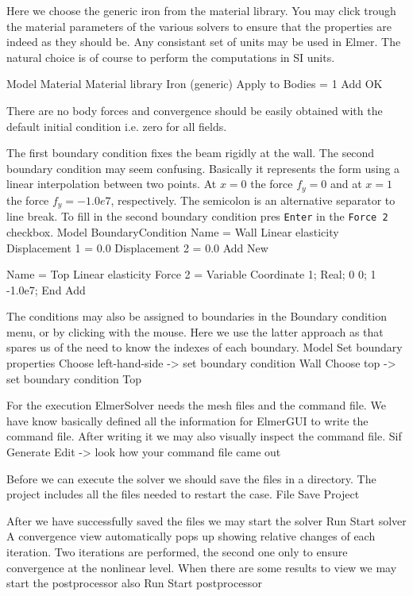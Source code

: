 Here we choose the generic iron from the material library.
You may click trough the material parameters of the various solvers to ensure that
the properties are indeed as they should be. Any consistant set of units may be used in Elmer.
The natural choice is of course to perform the computations in SI units. 

\ttbegin
Model
  Material
    Material library    
      Iron (generic)
    Apply to Bodies = 1 
    Add
    OK
\ttend

There are no body forces and convergence should be easily obtained with the default 
initial condition i.e. zero for all fields.

The first boundary condition fixes the beam rigidly at the wall.
The second boundary condition may seem confusing. Basically it represents the form 
using a linear interpolation between two points. At $x=0$ the force $f_y = 0$ and 
at $x=1$ the force $f_y=-1.0e7$, respectively. The semicolon is an alternative separator
to line break. To fill in the second boundary condition pres \texttt{Enter} in the 
\texttt{Force 2} checkbox.
\ttbegin
Model
  BoundaryCondition
    Name = Wall
    Linear elasticity
      Displacement 1 = 0.0
      Displacement 2 = 0.0
    Add
    New

    Name = Top
    Linear elasticity 
      Force 2 = Variable Coordinate 1; Real; 0 0; 1 -1.0e7; End
    Add 
\ttend   

The conditions may also be assigned to boundaries in the Boundary condition menu, or 
by clicking with the mouse. Here we use the latter approach as that spares us of the 
need to know the indexes of each boundary.
\ttbegin
Model
  Set boundary properties
    Choose left-hand-side -> set boundary condition Wall
    Choose top -> set boundary condition Top
\ttend

For the execution 
ElmerSolver needs the mesh files and the command file. We have know basically defined
all the information for ElmerGUI to write the command file. After writing it we may also visually 
inspect the command file.
\ttbegin
Sif 
  Generate
  Edit -> look how your command file came out  
\ttend

Before we can execute the solver we should save the files in a directory. The project includes
all the files needed to restart the case.
\ttbegin
File 
  Save Project
\ttend

After we have successfully saved the files we may start the solver
\ttbegin
Run
  Start solver
\ttend
A convergence view automatically pops up showing relative changes of each iteration.
Two iterations are performed, the second one only to ensure convergence at the nonlinear level.
When there are some results to view we may start the postprocessor also
\ttbegin
Run
  Start postprocessor
\ttend


